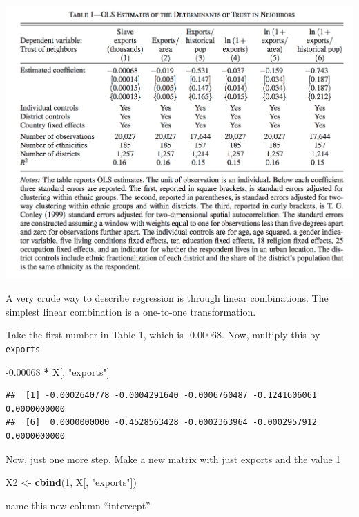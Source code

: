 \documentclass[
]{book}
\newenvironment{Shaded}{\begin{snugshade}}{\end{snugshade}}
\newcommand{\DecValTok}[1]{\textcolor[rgb]{0.00,0.00,0.81}{#1}}
\newcommand{\FloatTok}[1]{\textcolor[rgb]{0.00,0.00,0.81}{#1}}
\newcommand{\KeywordTok}[1]{\textcolor[rgb]{0.13,0.29,0.53}{\textbf{#1}}}
\newcommand{\NormalTok}[1]{#1}
\newcommand{\OperatorTok}[1]{\textcolor[rgb]{0.81,0.36,0.00}{\textbf{#1}}}
\newcommand{\StringTok}[1]{\textcolor[rgb]{0.31,0.60,0.02}{#1}}
\theoremstyle{definition}
\theoremstyle{definition}
\theoremstyle{definition}
\theoremstyle{definition}
\theoremstyle{remark}
\begin{document}
\includegraphics{images/nunn_wantchekon_table1.png}

A very crude way to describe regression is through linear combinations. The simplest linear combination is a one-to-one transformation.

Take the first number in Table 1, which is -0.00068. Now, multiply this by \texttt{exports}

\begin{Shaded}
\begin{Highlighting}[]
\FloatTok{-0.00068} \OperatorTok{*}\StringTok{ }\NormalTok{X[, }\StringTok{"exports"}\NormalTok{]}
\end{Highlighting}
\end{Shaded}

\begin{verbatim}
##  [1] -0.0002640778 -0.0004291640 -0.0006760487 -0.1241606061  0.0000000000
##  [6]  0.0000000000 -0.4528563428 -0.0002363964 -0.0002957912  0.0000000000
\end{verbatim}

Now, just one more step. Make a new matrix with just exports and the value 1

\begin{Shaded}
\begin{Highlighting}[]
\NormalTok{X2 <-}\StringTok{ }\KeywordTok{cbind}\NormalTok{(}\DecValTok{1}\NormalTok{, X[, }\StringTok{"exports"}\NormalTok{])}
\end{Highlighting}
\end{Shaded}

name this new column ``intercept''
\end{document}
